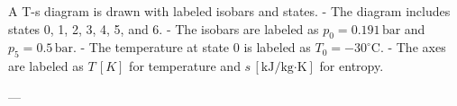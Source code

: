 A T-s diagram is drawn with labeled isobars and states.  
- The diagram includes states 0, 1, 2, 3, 4, 5, and 6.  
- The isobars are labeled as \( p_0 = 0.191 \, \text{bar} \) and \( p_5 = 0.5 \, \text{bar} \).  
- The temperature at state 0 is labeled as \( T_0 = -30^\circ \text{C} \).  
- The axes are labeled as \( T \, [K] \) for temperature and \( s \, [\text{kJ/kg·K}] \) for entropy.  

---